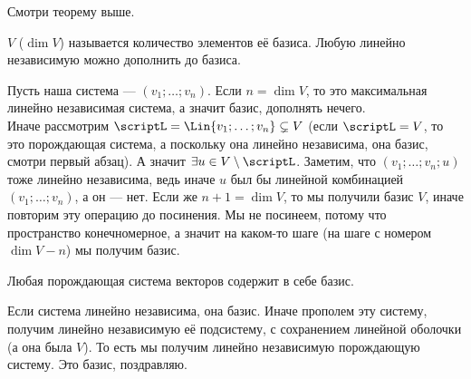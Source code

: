 \documentclass{article}
\begin{document}
\begin{itemize}
\begin{Proof}
            Смотри теорему выше.
        \end{Proof}
        \dfn {} $V$ ($\dim V$) называется количество элементов её базиса.
        \thm Любую линейно независимую можно дополнить до базиса.
        \begin{Proof}
            Пусть наша система --- $(v_1;\ldots;v_n)$. Если $n=\dim V$, то это максимальная линейно независимая система, а значит базис, дополнять нечего.\\
            Иначе рассмотрим $\scriptL=\Lin\{v_1;\ldots;v_n\}\subsetneq V$ (если $\scriptL=V$, то это порождающая система, а поскольку она линейно независима, она базис, смотри первый абзац). А значит $\exists u\in V\setminus\scriptL$. Заметим, что $(v_1;\ldots;v_n;u)$ тоже линейно независима, ведь иначе $u$ был бы линейной комбинацией $(v_1;\ldots;v_n)$, а он --- нет. Если же $n+1=\dim V$, то мы получили базис $V$, иначе повторим эту операцию до посинения. Мы не посинеем, потому что пространство конечномерное, а значит на каком-то шаге (на шаге с номером $\dim V-n$) мы получим базис.
        \end{Proof}
        \thm Любая порождающая система векторов содержит в себе базис.
        \begin{Proof}
            Если система линейно независима, она базис. Иначе прополем эту систему, получим линейно независимую её подсистему, с сохранением линейной оболочки (а она была $V$). То есть мы получим линейно независимую порождающую систему. Это базис, поздравляю.
        \end{Proof}
    \end{itemize}
\end{document}
